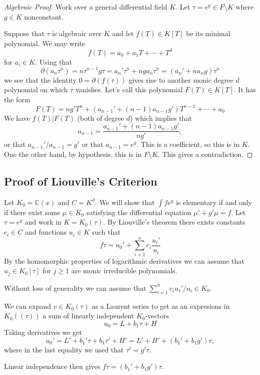 \documentclass[12pt]{book}
\numberwithin{equation}{section}
\theoremstyle{definition}
\theoremstyle{remark}
\newcommand{\CC}{\mathbb{C}}
\begin{document}
\begin{proof}[Algebraic Proof]
	Work over a general differential field $K$.
	Let $\tau = e^g \in F\setminus K$ where $g \in K$ nonconstant.  
	
	Suppose that $\tau$ is algebraic over $K$ and let $f(T) \in K[T]$ be its minimal polynomial. 
	We may write  
	$$f(T) = a_0 + a_1 T + \cdots + T^d$$ for $a_i \in K$.
	Using that 
	$$\partial(a_n \tau^n) = n \tau^{n-1} g \tau = a_n' \tau^n + n g a_n \tau^n = (a_n' + n a_n g) \tau^n$$ 
	we see that the identity
	 $0=\partial(f(\tau))$ gives rise to another monic degree $d$ polynomial on which $\tau$ vanishes. 
	 Let's call this polynomial $F(T)\in K[T]$. 
	 It has the form
	  $$ F(T) = ng' T^n + (a_{n-1}' + (n-1) a_{n-1}g')T^{n-1} + \cdots + a_0 $$ 
	 We have $f(T) \vert F(T)$ (both of degree $d$) which implies that 
	  $$ a_{n-1}  = \frac{a_{n-1}' + (n-1) a_{n-1}g'}{n g'},$$
	 or that $a_{n-1}'/a_{n-1} = g'$ or that $a_{n-1} = e^g$.
	 This is a coefficient, so this is in $K$. 
	 One the other hand, by hypothesis, this is in $F\setminus K$. 
	 This gives a contradiction.
\end{proof}

\subsection{Proof of Liouville's Criterion}

Let $K_0 =\CC(x)$ and $C = K^{\partial}$.
We will show that $\int f e^g$ is elementary if and only if there exist some $\mu\in K_0$ satisfying the differential equation $\mu'+g'\mu = f$. 
Let $\tau = e^g$ and work in $K = K_0(\tau)$.
By Liouville's theorem there exists constants $c_i \in C$ and functions $u_i \in K$ such that 
 $$ f\tau = u_0' + \sum_{i=1}^n c_i \dfrac{u_i'}{u_i}$$
By the homomorphic properties of logarithmic derivatives we can assume that $u_j \in K_0[\tau]$ for $j\geq 1$ are monic irreducible polynomials.

Without loss of generality we can assume that $\sum_{i=1}^n c_i u_i'/u_i \in K_0$. 

We can expand $v \in K_0(\tau)$ as a Laurent series to get as an expresions in $K_0((\tau))$ a sum of linearly independent $K_0$-vectors
 $$ u_0 = L + b_1 \tau + H$$
Taking derivatives we get 
 $$ u_0' = L' + b_1'\tau + b_1 \tau' + H'= L'+H' + (b_1' +b_1 g') \tau,$$
where in the last equality we used that $\tau' = g' \tau$.

Linear independence then gives $f\tau = (b_1' + b_1 g')\tau$.
\end{document}
